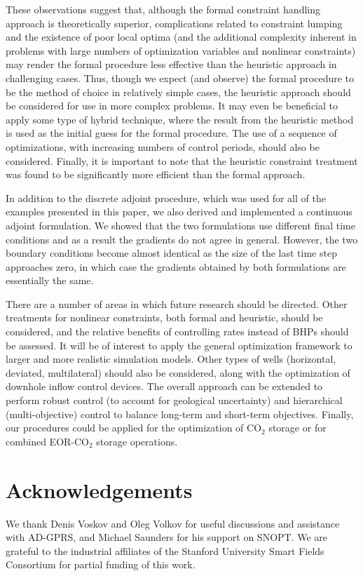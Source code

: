 These observations suggest that, although the formal constraint handling approach is theoretically superior, complications related to constraint lumping and the existence of poor local optima (and the additional complexity inherent in problems with large numbers of optimization variables and nonlinear constraints) may render the formal procedure less effective than the heuristic approach in challenging cases. Thus, though we expect (and observe) the formal procedure to be the method of choice in relatively simple cases, the heuristic approach should be considered for use in more complex problems. It may even be beneficial to apply some type of hybrid technique, where the result from the heuristic method is used as the initial guess for the formal procedure. The use of a sequence of optimizations, with increasing numbers of control periods, should also be considered. Finally, it is important to note that the heuristic constraint treatment was found to be significantly more efficient than the formal approach. 


In addition to the discrete adjoint procedure, which was used for all of the
examples presented in this paper, we also derived and implemented a continuous
adjoint formulation. We showed that the two formulations use different
final time conditions and as a result the gradients do not
agree in general. However, the two boundary conditions become almost identical as the
size of the last time step approaches zero, in which case the gradients obtained by
both formulations are essentially the same.

There are a number of areas in which future research should be directed. Other
treatments for nonlinear constraints, both formal and heuristic, should be
considered, and the relative benefits of controlling rates instead of BHPs
should be assessed. It will be of interest to apply the general optimization
framework to larger and more realistic simulation models. Other types of wells
(horizontal, deviated, multilateral) should also be considered, along with the
optimization of downhole inflow control devices. The overall approach can be 
extended to perform robust control (to account for geological uncertainty) and hierarchical
(multi-objective) control to balance long-term and short-term objectives. Finally, our procedures could be applied for the optimization of CO$_2$ storage or for combined
EOR-CO$_2$ storage operations.



\section*{Acknowledgements}
We thank Denis Voskov and Oleg Volkov for useful discussions and assistance with AD-GPRS, and
Michael Saunders for his support 
on SNOPT. We are grateful
to the industrial affiliates of the Stanford University Smart Fields Consortium for partial
funding of this work.



